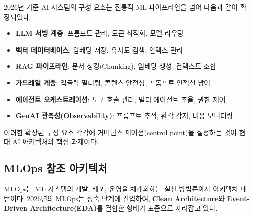 2026년 기준 AI 시스템의 구성 요소는 전통적 ML 파이프라인을 넘어 다음과 같이 확장되었다.

\begin{itemize}
 \item \textbf{LLM 서빙 계층}: 프롬프트 관리, 토큰 최적화, 모델 라우팅
 \item \textbf{벡터 데이터베이스}: 임베딩 저장, 유사도 검색, 인덱스 관리
 \item \textbf{RAG 파이프라인}: 문서 청킹(Chunking), 임베딩 생성, 컨텍스트 조합
 \item \textbf{가드레일\cite{casper2023explore} 계층}: 입출력 필터링, 콘텐츠 안전성, 프롬프트 인젝션 방어
 \item \textbf{에이전트 오케스트레이션}: 도구 호출 관리, 멀티 에이전트 조율, 권한 제어
 \item \textbf{GenAI 관측성(Observability)}: 프롬프트 추적, 환각 감지, 비용 모니터링
\end{itemize}

이러한 확장된 구성 요소 각각에 거버넌스 제어점(control point)을 설정하는 것이 현대 AI 아키텍처의 핵심 과제이다.


\subsection{MLOps 참조 아키텍처}
\label{sec:13.1.2}

MLOps는 ML 시스템의 개발, 배포, 운영을 체계화하는 실천 방법론이자 아키텍처 패턴이다. 2026년의 MLOps는 성숙 단계에 진입하여, \textbf{Clean Architecture}와 \textbf{Event-Driven Architecture(EDA)}를 결합한 형태가 표준으로 자리잡고 있다.

